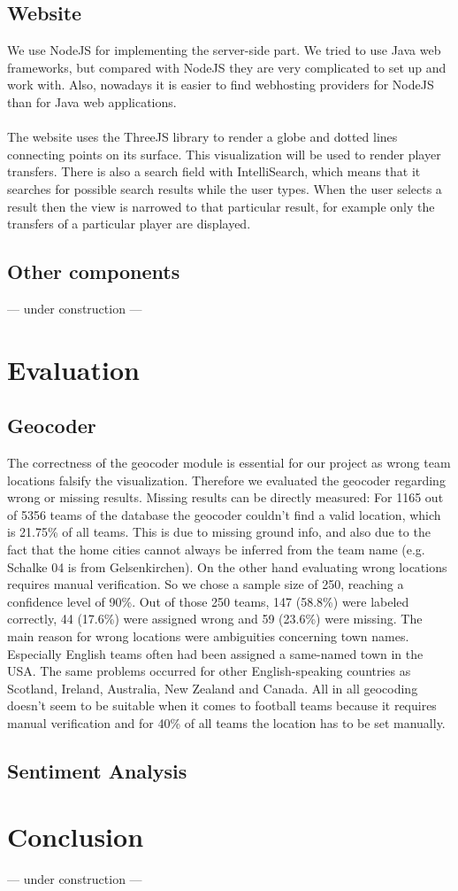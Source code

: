 \documentclass{article}
\begin{document}
\subsection{Website}

We use NodeJS \cite{NodeJS} for implementing the server-side part. We tried to use Java web frameworks, but compared with NodeJS they are very complicated to set up and work with. Also, nowadays it is easier to find webhosting providers for NodeJS than for Java web applications.
\\ \\
The website uses the ThreeJS library \cite{ThreeJS} to render a globe and dotted lines connecting points on its surface. This visualization will be used to render player transfers. There is also a search field with IntelliSearch, which means that it searches for possible search results while the user types. When the user selects a result then the view is narrowed to that particular result, for example only the transfers of a particular player are displayed.

\subsection{Other components}
--- under construction ---
\section{Evaluation}
\subsection{Geocoder}
The correctness of the geocoder module is essential for our project as wrong team locations falsify the visualization. Therefore we evaluated the geocoder regarding wrong or missing results. Missing results can be directly measured: For 1165 out of 5356 teams of the database the geocoder couldn't find a valid location, which is 21.75\% of all teams. This is due to missing ground info, and also due to the fact that the home cities cannot always be inferred from the team name (e.g. Schalke 04 is from Gelsenkirchen). On the other hand evaluating wrong locations requires manual verification. So we chose a sample size of 250, reaching a confidence level of 90\%. Out of those 250 teams, 147 (58.8\%) were labeled correctly, 44 (17.6\%) were assigned wrong and 59 (23.6\%) were missing. The main reason for wrong locations were ambiguities concerning town names. Especially English teams often had been assigned a same-named town in the USA. The same problems occurred for other English-speaking countries as Scotland, Ireland, Australia, New Zealand and Canada. All in all geocoding doesn't seem to be suitable when it comes to football teams because it requires manual verification and for 40\% of all teams the location has to be set manually.
\subsection{Sentiment Analysis}

\section{Conclusion}
--- under construction ---


\end{document}
